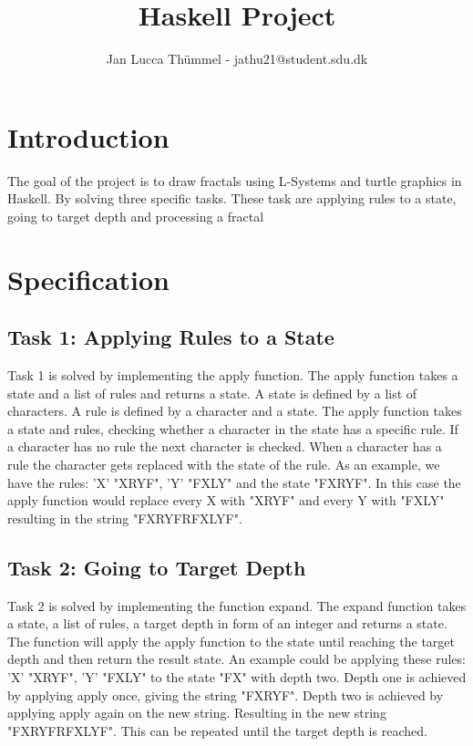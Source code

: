 \documentclass{article}
\title{Haskell Project}
\author{Jan Lucca Thümmel - jathu21@student.sdu.dk}
\begin{document}
\maketitle


\tableofcontents
\newpage

\section{Introduction}
The goal of the project is to draw fractals using L-Systems and turtle graphics in Haskell. By solving three specific tasks. These task are applying rules to a state, going to target depth and processing a fractal

\section{Specification}

\subsection{Task 1: Applying Rules to a State}
Task 1 is solved by implementing the apply function. The apply function takes a state and a list of rules and returns a state. A state is defined by a list of characters. A rule is defined by a character and a state. The apply function takes a state and rules, checking whether a character in the state has a specific rule. If a character has no rule the next character is checked. When a character has a rule the character gets replaced with the state of the rule. As an example, we have the rules: ’X’ "XRYF", ’Y’ "FXLY" and the state "FXRYF". In this case the apply function would replace every X with "XRYF" and every Y with "FXLY" resulting in the string "FXRYFRFXLYF".

\subsection{Task 2: Going to Target Depth}
Task 2 is solved by implementing the function expand. The expand function takes a state, a list of rules, a target depth in form of an integer and returns a state. The function will apply the apply function to the state until reaching the target depth and then return the result state. An example could be applying these rules: ’X’ "XRYF", ’Y’ "FXLY" to the state "FX" with depth two. Depth one is achieved by applying apply once, giving the string "FXRYF". Depth two is achieved by applying apply again on the new string. Resulting in the new string "FXRYFRFXLYF". This can be repeated until the target depth is reached.
\end{document}
